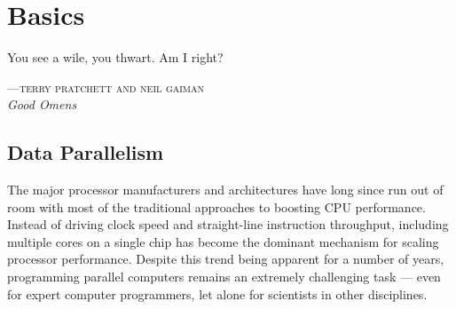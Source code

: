 %
%
%
%

\chapter{Basics}  %
\epigraph{You see a wile, you thwart. Am I right?}%
{\textsc{---terry pratchett and neil gaiman}\\\textit{Good Omens}}


\section{Data Parallelism}

The major processor manufacturers and architectures have long since run out of
room with most of the traditional approaches to boosting CPU performance.
Instead of driving clock speed and straight-line instruction throughput,
including multiple cores on a single chip has become the dominant mechanism for
scaling processor performance. Despite this trend being apparent for a number of
years, programming parallel computers remains an extremely challenging task ---
even for expert computer programmers, let alone for scientists in other
disciplines.

